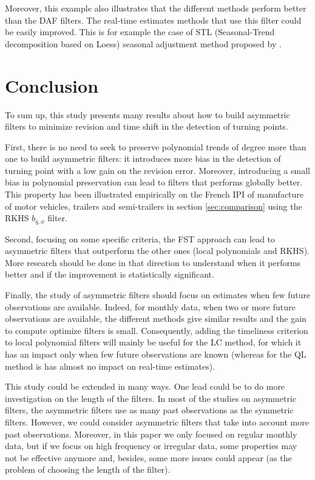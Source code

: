 \documentclass[
  12pt,
  ,
  a4paper]{article}
\newcommand\1{\mathds{1}}
\begin{document}
Moreover, this example also illustrates that the different methods perform better than the DAF filters.
The real-time estimates methods that use this filter could be easily improved.
This is for example the case of STL (Seasonal-Trend decomposition based on Loess) seasonal adjustment method proposed by \textcite{cleveland90}.

\newpage

\hypertarget{conclusion}{%
\section*{Conclusion}\label{conclusion}}

To sum up, this study presents many results about how to build asymmetric filters to minimize revision and time shift in the detection of turning points.

First, there is no need to seek to preserve polynomial trends of degree more than one to build asymmetric filters: it introduces more bias in the detection of turning point with a low gain on the revision error. Moreover, introducing a small bias in polynomial preservation can lead to filters that performs globally better.
This property has been illustrated empirically on the French IPI of manufacture of motor vehicles, trailers and semi-trailers in section \ref{sec:comparison} using the RKHS \(b_{q,\phi}\) filter.

Second, focusing on some specific criteria, the FST approach can lead to asymmetric filters that outperform the other ones (local polynomials and RKHS).
More research should be done in that direction to understand when it performs better and if the improvement is statistically significant.

Finally, the study of asymmetric filters should focus on estimates when few future observations are available.
Indeed, for monthly data, when two or more future observations are available, the different methods give similar results and the gain to compute optimize filters is small.
Consequently, adding the timeliness criterion to local polynomial filters will mainly be useful for the LC method, for which it has an impact only when few future observations are known (whereas for the QL method is has almost no impact on real-time estimates).

This study could be extended in many ways.
One lead could be to do more investigation on the length of the filters.
In most of the studies on asymmetric filters, the asymmetric filters use as many past observations as the symmetric filters.
However, we could consider asymmetric filters that take into account more past observations.
Moreover, in this paper we only focused on regular monthly data, but if we focus on high frequency or irregular data, some properties may not be effective anymore and, besides, some more issues could appear (as the problem of choosing the length of the filter).
\end{document}
